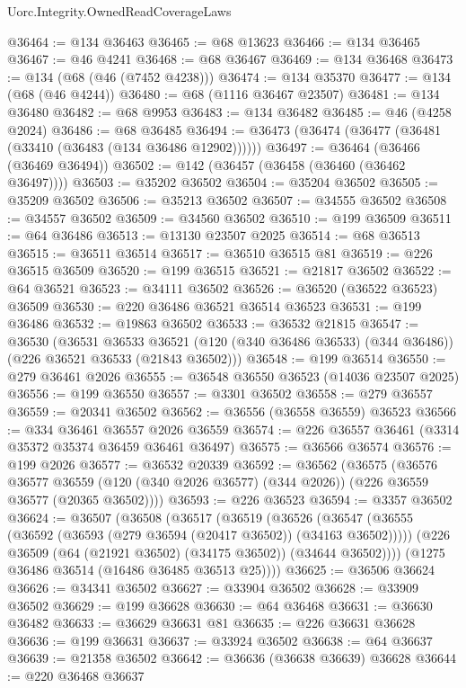 \begin{lexlean}{Uorc.Integrity.OwnedReadCoverageLaws}
\begin{coremodule}
@36464 := @134 @36463
@36465 := @68 @13623
@36466 := @134 @36465
@36467 := @46 @4241
@36468 := @68 @36467
@36469 := @134 @36468
@36473 := @134 (@68 (@46 (@7452 @4238)))
@36474 := @134 @35370
@36477 := @134 (@68 (@46 @4244))
@36480 := @68 (@1116 @36467 @23507)
@36481 := @134 @36480
@36482 := @68 @9953
@36483 := @134 @36482
@36485 := @46 (@4258 @2024)
@36486 := @68 @36485
@36494 := @36473 (@36474 (@36477 (@36481 (@33410 (@36483 (@134 @36486 @12902))))))
@36497 := @36464 (@36466 (@36469 @36494))
@36502 := @142 (@36457 (@36458 (@36460 (@36462 @36497))))
@36503 := @35202 @36502
@36504 := @35204 @36502
@36505 := @35209 @36502
@36506 := @35213 @36502
@36507 := @34555 @36502
@36508 := @34557 @36502
@36509 := @34560 @36502
@36510 := @199 @36509
@36511 := @64 @36486
@36513 := @13130 @23507 @2025
@36514 := @68 @36513
@36515 := @36511 @36514
@36517 := @36510 @36515 @81
@36519 := @226 @36515 @36509
@36520 := @199 @36515
@36521 := @21817 @36502
@36522 := @64 @36521
@36523 := @34111 @36502
@36526 := @36520 (@36522 @36523) @36509
@36530 := @220 @36486 @36521 @36514 @36523
@36531 := @199 @36486
@36532 := @19863 @36502
@36533 := @36532 @21815
@36547 := @36530
    (@36531
      @36533
      @36521
      (@120 (@340 @36486 @36533) (@344 @36486))
      (@226 @36521 @36533 (@21843 @36502)))
@36548 := @199 @36514
@36550 := @279 @36461 @2026
@36555 := @36548 @36550 @36523 (@14036 @23507 @2025)
@36556 := @199 @36550
@36557 := @3301 @36502
@36558 := @279 @36557
@36559 := @20341 @36502
@36562 := @36556 (@36558 @36559) @36523
@36566 := @334 @36461 @36557 @2026 @36559
@36574 := @226 @36557 @36461 (@3314 @35372 @35374 @36459 @36461 @36497)
@36575 := @36566 @36574
@36576 := @199 @2026
@36577 := @36532 @20339
@36592 := @36562
    (@36575
      (@36576
        @36577
        @36559
        (@120 (@340 @2026 @36577) (@344 @2026))
        (@226 @36559 @36577 (@20365 @36502))))
@36593 := @226 @36523
@36594 := @3357 @36502
@36624 := @36507
    (@36508
      (@36517
        (@36519
          (@36526
            (@36547 (@36555 (@36592 (@36593 (@279 @36594 (@20417 @36502)) (@34163 @36502)))))
            (@226 @36509 (@64 (@21921 @36502) (@34175 @36502)) (@34644 @36502))))
        (@1275 @36486 @36514 (@16486 @36485 @36513 @25))))
@36625 := @36506 @36624
@36626 := @34341 @36502
@36627 := @33904 @36502
@36628 := @33909 @36502
@36629 := @199 @36628
@36630 := @64 @36468
@36631 := @36630 @36482
@36633 := @36629 @36631 @81
@36635 := @226 @36631 @36628
@36636 := @199 @36631
@36637 := @33924 @36502
@36638 := @64 @36637
@36639 := @21358 @36502
@36642 := @36636 (@36638 @36639) @36628
@36644 := @220 @36468 @36637

\end{coremodule}
\end{lexlean}
